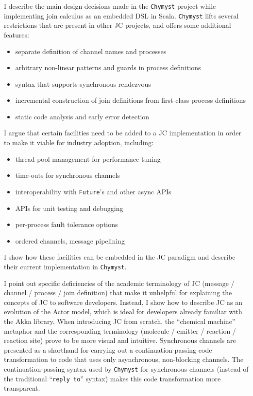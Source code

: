 \documentclass[sigplan,10pt,review,anonymous]{acmart}\settopmatter{printfolios=true}
\begin{document}
I describe the main design decisions made in the \texttt{Chymyst}
project while implementing join calculus as an embedded DSL in Scala. 
\texttt{Chymyst} lifts several restrictions that are present in other
JC projects, and offers some additional features:
\begin{itemize}
\item separate definition of channel names and processes
\item arbitrary non-linear patterns and guards in process definitions
\item syntax that supports synchronous rendezvous
\item incremental construction of join definitions from first-class process
definitions
\item static code analysis and early error detection
\end{itemize}
I argue that certain facilities need to be added to a JC implementation
in order to make it viable for industry adoption, including:
\begin{itemize}
\item thread pool management for performance tuning
\item time-outs for synchronous channels
\item interoperability with \texttt{Future}'s and other async APIs
\item APIs for unit testing and debugging
\item per-process fault tolerance options
\item ordered channels, message pipelining
\end{itemize}
I show how these facilities can be embedded in the JC paradigm
and describe their current implementation in \texttt{Chymyst}.

I point out specific deficiencies of the academic terminology of JC
(message / channel / process / join definition) that make it unhelpful
for explaining the concepts of JC to software developers. Instead,
I show how to describe JC as an evolution of the Actor model, which
is ideal for developers already familiar with the Akka library. When
introducing JC from scratch, the ``chemical machine''
metaphor and the corresponding terminology (molecule / emitter
/ reaction / reaction site) prove to be more visual and intuitive. Synchronous
channels are presented as a shorthand for carrying out a continuation-passing
code transformation to code that uses only asynchronous,
non-blocking channels. The continuation-passing syntax used by \texttt{Chymyst}
for synchronous channels (instead of the traditional ``\texttt{reply
to}'' syntax) makes this code transformation more transparent.
\end{document}
